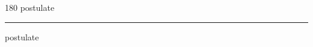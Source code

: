 
\begin{frame}
\begin{center}
\begin{turn}{180}
{\fontsize{2.5cm}{1em}\selectfont postulate}
\end{turn}
\vspace{1em}\par  
\hrule
\vspace{1em}\par  
{\fontsize{2.5cm}{1em}\selectfont postulate}
\end{center}
\end{frame}
